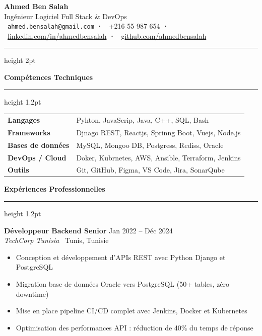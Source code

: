 \documentclass[10pt,a4paper]{article}
\newcommand{\cvsection}[1]{%
    \vspace{6pt}%
    {\color{primary}\large\bfseries #1}%
    \vspace{1pt}%
    {\color{primary}\hrule height 1.2pt}%
    \vspace{4pt}%
}
\newcommand{\cventry}[4]{%
    \textbf{#1} \hfill \textcolor{secondary}{\small #2}\\%
    \textit{\textcolor{secondary}{#3}} \hfill \textcolor{secondary}{\small\faMapMarker*\ #4}%
    \vspace{1pt}%
}
\begin{document}
\begin{center}
    {\Huge\bfseries\color{primary} Ahmed Ben Salah}\\[5pt]
    {\large\color{secondary} Ingénieur Logiciel Full Stack \& DevOps}\\[6pt]
    \textcolor{secondary}{
        \faEnvelope\ \texttt{ahmed.bensalah@gmail.com}
        \quad\textbf{·}\quad
        \faPhone\ +216 55 987 654
        \quad\textbf{·}\quad
        \faLinkedin\ \href{https://linkedin.com/in/ahmedbensalah}{linkedin.com/in/ahmedbensalah}
        \quad\textbf{·}\quad
        \faGithub\ \href{https://github.com/ahmedbensalah}{github.com/ahmedbensalah}
    }
\end{center}

\vspace{2pt}
{\color{primary}\hrule height 2pt}
\vspace{8pt}

\cvsection{Compétences Techniques}

\begin{tabular}{@{}lp{13cm}}
    \textbf{Langages}        & Pyhton, JavaScrip, Java, C++, SQL, Bash \\[2pt]
    \textbf{Frameworks}      & Djnago REST, Reactjs, Sprinng Boot, Vuejs, Node.js \\[2pt]
    \textbf{Bases de données}& MySQL, Mongoo DB, Postgress, Rediss, Oracle \\[2pt]
    \textbf{DevOps / Cloud}  & Doker, Kubrnetes, AWS, Ansible, Terraform, Jenkins \\[2pt]
    \textbf{Outils}          & Git, GitHub, Figma, VS Code, Jira, SonarQube \\
\end{tabular}

\cvsection{Expériences Professionnelles}

\cventry{Développeur Backend Senior}{Jan 2022 -- Déc 2024}{TechCorp Tunisia}{Tunis, Tunisie}
\begin{itemize}[leftmargin=1.2em, itemsep=0pt, topsep=2pt]
    \item Conception et développement d'APIs REST avec Python Django et PostgreSQL
    \item Migration base de données Oracle vers PostgreSQL (50+ tables, zéro downtime)
    \item Mise en place pipeline CI/CD complet avec Jenkins, Docker et Kubernetes
    \item Optimisation des performances API : réduction de 40\% du temps de réponse
\end{itemize}
\end{document}
